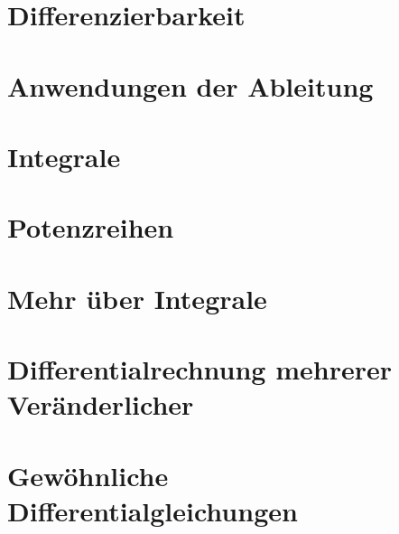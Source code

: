\documentclass[]{article}
\begin{document}
\pagebreak

\section{Differenzierbarkeit}



\section{Anwendungen der Ableitung}


\section{Integrale}


\section{Potenzreihen}


\section{Mehr über Integrale}


\section{Differentialrechnung mehrerer Veränderlicher}


\section{Gewöhnliche Differentialgleichungen}
\end{document}
